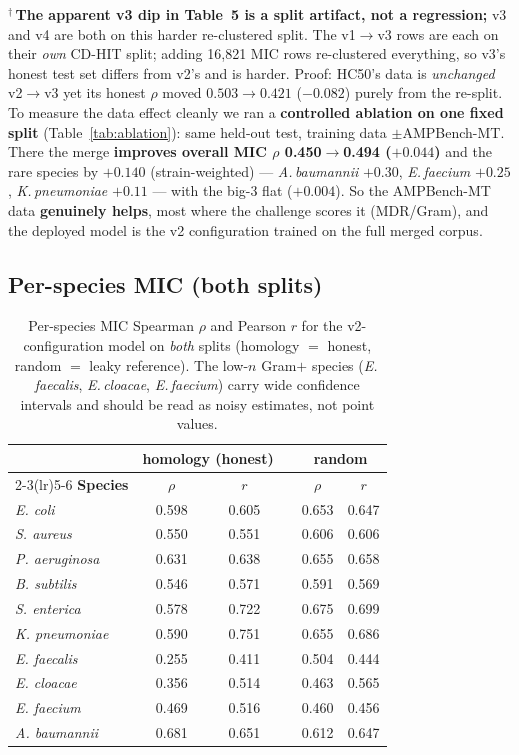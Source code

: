 \documentclass[11pt]{article}
\newcommand{\spn}[1]{\textit{#1}}
\begin{document}
$^{\dagger}$\,\textbf{The apparent v3 dip in Table~5 is a split artifact, not a regression;} v3 and
v4 are both on this harder re-clustered split. The v1$\to$v3 rows are each on their \emph{own} CD-HIT
split; adding 16{,}821 MIC rows re-clustered everything, so v3's honest test set differs from v2's
and is harder. Proof: HC50's data is
\emph{unchanged} v2$\to$v3 yet its honest $\rho$ moved $0.503\!\to\!0.421$ ($-0.082$) purely from
the re-split. To measure the data effect cleanly we ran a \textbf{controlled ablation on one fixed
split} (Table~\ref{tab:ablation}): same held-out test, training data $\pm$AMPBench-MT. There the merge
\textbf{improves overall MIC $\rho$ 0.450$\to$0.494 ($+0.044$)} and the rare species by
$+0.140$ (strain-weighted) --- \spn{A.\,baumannii} $+0.30$, \spn{E.\,faecium} $+0.25$,
\spn{K.\,pneumoniae} $+0.11$ --- with the big-3 flat ($+0.004$). So the AMPBench-MT data
\textbf{genuinely helps}, most where the challenge scores it (MDR/Gram), and the deployed model is
the v2 configuration trained on the full merged corpus.

\subsection{Per-species MIC (both splits)}

\begin{table}[h]\centering\small
\caption{Per-species MIC Spearman $\rho$ and Pearson $r$ for the v2-configuration model on \emph{both}
splits (homology $=$ honest, random $=$ leaky reference). The low-$n$ Gram$+$ species
(\spn{E.\,faecalis}, \spn{E.\,cloacae}, \spn{E.\,faecium}) carry wide confidence intervals and should
be read as noisy estimates, not point values.}
\setlength{\tabcolsep}{5pt}
\begin{tabular}{@{}lcclcc@{}}
\toprule
& \multicolumn{2}{c}{\textbf{homology (honest)}} & & \multicolumn{2}{c}{\textbf{random}} \\
\cmidrule(lr){2-3}\cmidrule(lr){5-6}
\textbf{Species} & $\rho$ & $r$ & & $\rho$ & $r$ \\
\midrule
\spn{E. coli}       & 0.598 & 0.605 & & 0.653 & 0.647 \\
\spn{S. aureus}     & 0.550 & 0.551 & & 0.606 & 0.606 \\
\spn{P. aeruginosa} & 0.631 & 0.638 & & 0.655 & 0.658 \\
\spn{B. subtilis}   & 0.546 & 0.571 & & 0.591 & 0.569 \\
\spn{S. enterica}   & 0.578 & 0.722 & & 0.675 & 0.699 \\
\spn{K. pneumoniae} & 0.590 & 0.751 & & 0.655 & 0.686 \\
\spn{E. faecalis}   & 0.255 & 0.411 & & 0.504 & 0.444 \\
\spn{E. cloacae}    & 0.356 & 0.514 & & 0.463 & 0.565 \\
\spn{E. faecium}    & 0.469 & 0.516 & & 0.460 & 0.456 \\
\spn{A. baumannii}  & 0.681 & 0.651 & & 0.612 & 0.647 \\
\bottomrule
\end{tabular}
\end{table}
\end{document}

